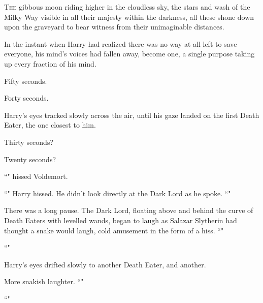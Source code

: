 
\lettrine{T}{he} gibbous moon riding higher in the cloudless sky, the stars and wash of the Milky Way visible in all their majesty within the darkness, all these shone down upon the graveyard to bear witness from their unimaginable distances.

In the instant when Harry had realized there was no way at all left to save everyone, his mind's voices had fallen away, become one, a single purpose taking up every fraction of his mind.

Fifty seconds.

Forty seconds.

Harry's eyes tracked slowly across the air, until his gaze landed on the first Death Eater, the one closest to him.

Thirty seconds?

Twenty seconds?

``" hissed Voldemort.

``" Harry hissed. He didn't look directly at the Dark Lord as he spoke. ``"

There was a long pause. The Dark Lord, floating above and behind the curve of Death Eaters with levelled wands, began to laugh as Salazar Slytherin had thought a snake would laugh, cold amusement in the form of a hiss. ``"

``"

Harry's eyes drifted slowly to another Death Eater, and another.

More snakish laughter. ``"

``"

